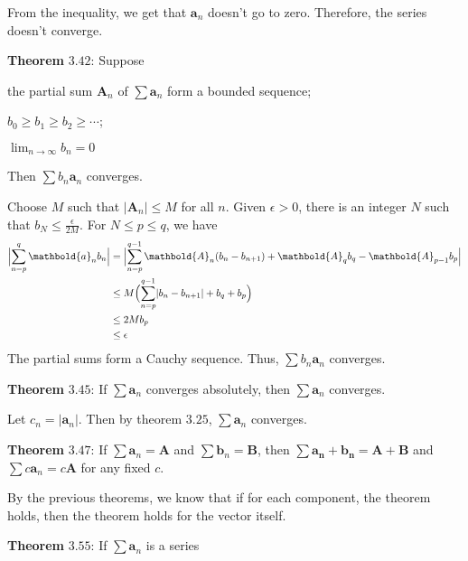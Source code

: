 \begin{exercise}
\begin{exercise}[label = (\alph*)]
    From the inequality, we get that \(\mathbold{a}_n\) doesn't go to zero.
    Therefore, the series doesn't converge.
  \end{exercise}
  \textbf{Theorem} \(\mathbold{3.42}\): Suppose
  \begin{exercise}[label = (\alph*)]
  \item
    the partial sum \(\mathbold{A}_n\) of \(\sum\mathbold{a}_n\) form a bounded
    sequence;
  \item
    \(b_0\geq b_1\geq b_2\geq\cdots\);
  \item
    \(\lim_{n\to\infty}b_n = 0\)
  \end{exercise}
  Then \(\sum b_n\mathbold{a}_n\) converges.
  \par\smallskip
  Choose \(M\) such that \(\lvert\mathbold{A}_n\rvert\leq M\) for all \(n\).
  Given \(\epsilon > 0\), there is an integer \(N\) such that
  \(b_N\leq\frac{\epsilon}{2M}\).
  For \(N\leq p\leq q\), we have
  \begin{align*}
    \Bigl\lvert\sum_{n = p}^q\mathbold{a}_nb_n\Bigr\rvert
    & = \Bigl\lvert\sum_{n = p}^{q - 1}\mathbold{A}_n(b_n - b_{n + 1}) +
      \mathbold{A}_qb_q - \mathbold{A}_{p - 1}b_p\Bigr\rvert\\
    & \leq M\Bigl(\sum_{n = p}^{q - 1}\lvert b_n - b_{n + 1}\rvert + b_q +
      b_p\Bigr)\\
    & \leq 2Mb_p\\
    & \leq \epsilon
  \end{align*}
  The partial sums form a Cauchy sequence.
  Thus, \(\sum b_n\mathbold{a}_n\) converges.
  \par\smallskip
  \textbf{Theorem} \(\mathbold{3.45}\): If \(\sum\mathbold{a}_n\) converges
  absolutely, then \(\sum\mathbold{a}_n\) converges.
  \par\smallskip
  Let \(c_n = \lvert\mathbold{a}_n\rvert\).
  Then by theorem \(3.25\), \(\sum\mathbold{a}_n\) converges.
  \par\smallskip
  \textbf{Theorem} \(\mathbold{3.47}\): If
  \(\sum\mathbold{a}_n = \mathbold{A}\) and
  \(\sum\mathbold{b}_n = \mathbold{B}\), then
  \(\sum\mathbold{a_n + b_n} = \mathbold{A + B}\) and
  \(\sum c\mathbold{a}_n = c\mathbold{A}\) for any fixed \(c\).
  \par\smallskip
  By the previous theorems, we know that if for each component, the theorem
  holds, then the theorem holds for the vector itself.
  \par\smallskip
  \textbf{Theorem} \(\mathbold{3.55}\): If \(\sum\mathbold{a}_n\) is a series

\end{exercise}
